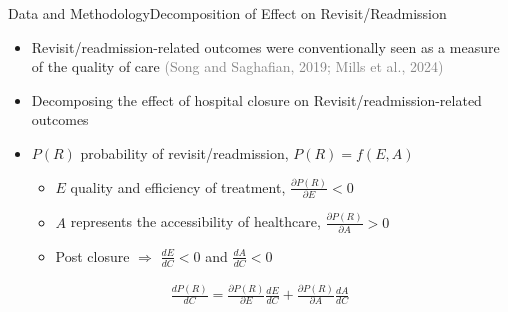 \documentclass{beamer}
\theoremstyle{definition}
\begin{document}
\begin{frame}{Data and Methodology}{Decomposition of Effect on Revisit/Readmission}

\begin{itemize}
\setlength{\itemsep}{15pt}
    \item Revisit/readmission-related outcomes were conventionally seen as a measure of the quality of care \textcolor{gray}{(Song and Saghafian, 2019; Mills et al., 2024)}
    \item Decomposing the effect of hospital closure on Revisit/readmission-related outcomes
    \item \( P(R) \) probability of revisit/readmission, $P(R) = f(E, A)$
    \begin{itemize}
        \item \( E \) quality and efficiency of treatment, $\frac{\partial P(R)}{\partial E} < 0$ %
        \item \( A \) represents the accessibility of healthcare, $\frac{\partial P(R)}{\partial A} > 0$ %
        \item Post closure $\Rightarrow$ $\frac{dE}{dC}<0$ and $\frac{dA}{dC}<0$
    \end{itemize}
\end{itemize}
\begin{align*}
\frac{dP(R)}{dC} = \frac{\partial P(R)}{\partial E} \frac{dE}{dC} + \frac{\partial P(R)}{\partial A} \frac{dA}{dC}
\end{align*}
\end{frame}
\end{document}
